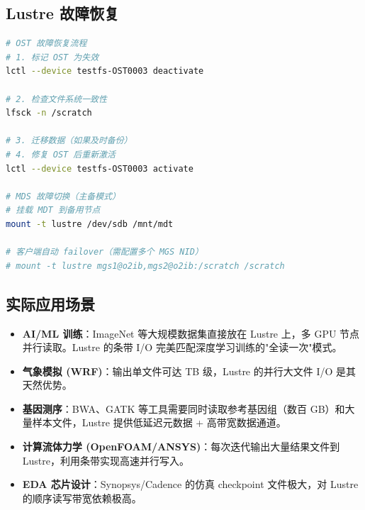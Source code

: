 \documentclass[12pt,UTF8]{ctexbook}
\begin{document}
\subsection{Lustre 故障恢复}

\begin{lstlisting}[language=bash]
# OST 故障恢复流程
# 1. 标记 OST 为失效
lctl --device testfs-OST0003 deactivate

# 2. 检查文件系统一致性
lfsck -n /scratch

# 3. 迁移数据（如果及时备份）
# 4. 修复 OST 后重新激活
lctl --device testfs-OST0003 activate

# MDS 故障切换（主备模式）
# 挂载 MDT 到备用节点
mount -t lustre /dev/sdb /mnt/mdt

# 客户端自动 failover（需配置多个 MGS NID）
# mount -t lustre mgs1@o2ib,mgs2@o2ib:/scratch /scratch
\end{lstlisting}

\subsection{实际应用场景}

\begin{itemize}
    \item \textbf{AI/ML 训练}：ImageNet 等大规模数据集直接放在 Lustre 上，多 GPU 节点并行读取。Lustre 的条带 I/O 完美匹配深度学习训练的"全读一次"模式。
    \item \textbf{气象模拟 (WRF)}：输出单文件可达 TB 级，Lustre 的并行大文件 I/O 是其天然优势。
    \item \textbf{基因测序}：BWA、GATK 等工具需要同时读取参考基因组（数百 GB）和大量样本文件，Lustre 提供低延迟元数据 + 高带宽数据通道。
    \item \textbf{计算流体力学 (OpenFOAM/ANSYS)}：每次迭代输出大量结果文件到 Lustre，利用条带实现高速并行写入。
    \item \textbf{EDA 芯片设计}：Synopsys/Cadence 的仿真 checkpoint 文件极大，对 Lustre 的顺序读写带宽依赖极高。
\end{itemize}
\end{document}
